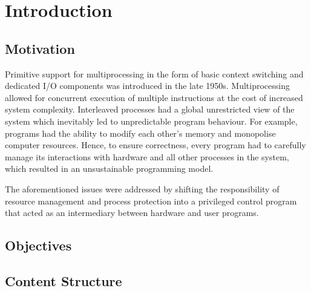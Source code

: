 \chapter{Introduction}
\section{Motivation}
Primitive support for multiprocessing in the form of basic context switching and dedicated I/O 
components was introduced in the late 1950s. Multiprocessing allowed for concurrent execution of 
multiple instructions at the cost of increased system complexity. Interleaved processes had a 
global unrestricted view of the system which inevitably led to unpredictable program behaviour. 
For example, programs had the ability to modify each other's memory and monopolise 
computer resources. Hence, to ensure correctness, every program had to carefully manage its interactions 
with hardware and all other processes in the system, which resulted in an unsustainable 
programming model.

The aforementioned issues were addressed by shifting the responsibility of resource management 
and process protection into a privileged control program that acted as an intermediary between 
hardware and user programs.

\section{Objectives}
\section{Content Structure}